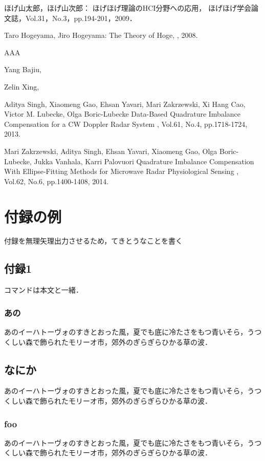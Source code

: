 \begin{bib}[100]


  ほげ山太郎，ほげ山次郎：
  \newblock ほげほげ理論のHCI分野への応用，
  \newblock ほげほげ学会論文誌，Vol.31，No.3，pp.194-201，2009．

  Taro Hogeyama, Jiro Hogeyama:
  \newblock The Theory of Hoge,
  , 2008.

  AAA

  Yang Bajiu, 

  Zelin Xing, 
	
  Aditya Singh, Xiaomeng Gao, Ehsan Yavari, Mari Zakrzewski, Xi Hang Cao, Victor M. Lubecke, Olga Boric-Lubecke
  \newblock Data-Based Quadrature Imbalance Compensation for a CW Doppler Radar System
  , Vol.61, No.4, pp.1718-1724, 2013.

  Mari Zakrzewski, Aditya Singh, Ehsan Yavari, Xiaomeng Gao, Olga Boric-Lubecke, Jukka Vanhala, Karri Palovuori
  \newblock Quadrature Imbalance Compensation With Ellipse-Fitting Methods for Microwave Radar Physiological Sensing
  , Vol.62, No.6, pp.1400-1408, 2014.

\end{bib}

\appendix
\chapter{付録の例}

付録を無理矢理出力させるため，てきとうなことを書く

\section{付録1}

コマンドは本文と一緒．

\subsection{あの}

あのイーハトーヴォのすきとおった風，夏でも底に冷たさをもつ青いそら，うつくしい森で飾られたモリーオ市，郊外のぎらぎらひかる草の波．

\section{なにか}

あのイーハトーヴォのすきとおった風，夏でも底に冷たさをもつ青いそら，うつくしい森で飾られたモリーオ市，郊外のぎらぎらひかる草の波．

\subsection{foo}

あのイーハトーヴォのすきとおった風，夏でも底に冷たさをもつ青いそら，うつくしい森で飾られたモリーオ市，郊外のぎらぎらひかる草の波．



